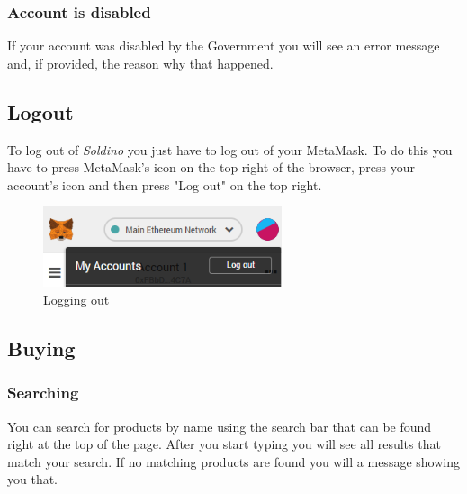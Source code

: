 	\subsubsection{Account is disabled}
	If your account was disabled by the Government you will see an error 
	message and, if provided, the reason why that happened.
	\subsection{Logout}
	To log out of \textit{Soldino} you just have to log out of 
	your MetaMask. To do this you have to press MetaMask's icon on the top 
	right of the browser, press your account's icon and then press "Log out"
	on the top right.
	\begin{figure}[H]
		\includegraphics[width=7cm]{res/images/logout_metamask.png}
		\centering
		\caption{Logging out}
	\end{figure}
	\subsection{Buying}
	\subsubsection{Searching}
	You can search for products by name using the search bar that can be found 
	right at the top of the page. After you start typing you will see all 
	results that match your search. If no matching products are found you will 
	a message showing you that.
